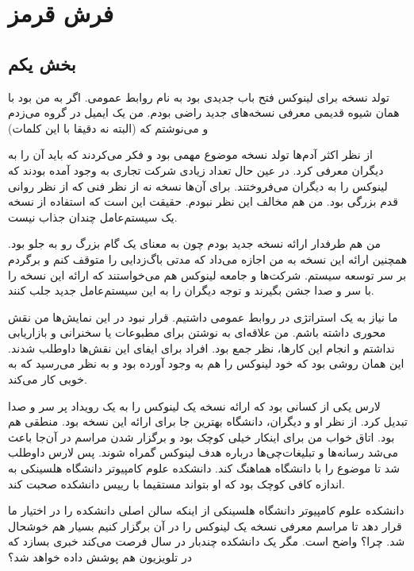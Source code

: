 \chapter{فرش قرمز}\label{ch4}
\section{بخش یکم}
تولد نسخه  برای لینوکس فتح باب جدیدی بود به نام روابط
عمومی. اگر به من بود با همان شیوه قدیمی معرفی نسخه‌های جدید راضی
بودم. من یک ایمیل در گروه می‌زدم و می‌نوشتم که  (البته نه دقیقا با این کلمات)

از نظر اکثر آدم‌ها تولد نسخه  موضوع مهمی بود و فکر می‌کردند که
باید آن را به دیگران معرفی کرد. در عین حال تعداد زیادی شرکت تجاری به
وجود آمده بودند که لینوکس را به دیگران می‌فروختند. برای آن‌ها نسخه
 نه از نظر فنی که از نظر روانی قدم بزرگی بود. من هم مخالف
این نظر نبودم. حقیقت این است که استفاده از نسخه  یک
سیستم‌عامل چندان جذاب نیست.

من هم طرفدار ارائه نسخه جدید بودم چون به معنای یک گام بزرگ رو به جلو
بود. همچنین ارائه این نسخه به من اجازه می‌داد که مدتی باگ‌زدایی را متوقف
کنم و برگردم بر سر توسعه سیستم. شرکت‌ها و جامعه لینوکس هم می‌خواستند که
ارائه این نسخه را با سر و صدا جشن بگیرند و توجه دیگران را به این
سیستم‌عامل جدید جلب کنند.

ما نیاز به یک استراتژی در روابط عمومی داشتیم. قرار نبود در این نمایش‌ها
من نقش محوری داشته باشم. من علاقه‌ای به نوشتن برای مطبوعات یا سخنرانی و
بازاریابی نداشتم و انجام این کارها، نظر جمع بود. افراد برای ایفای این
نقش‌ها داوطلب شدند. این همان روشی بود که خود لینوکس را هم به وجود آورده
بود و به نظر می‌رسید که به خوبی کار می‌کند.

لارس یکی از کسانی بود که ارائه نسخه یک لینوکس را به یک رویداد پر سر و
صدا تبدیل کرد. از نظر او و دیگران، دانشگاه بهترین جا برای ارائه این
نسخه بود. منطقی هم بود. اتاق خواب من برای اینکار خیلی کوچک بود و
برگزار شدن مراسم در آن‌جا باعث می‌شد رسانه‌ها و تبلیغات‌چی‌ها درباره هدف
لینوکس گمراه شوند. پس لارس داوطلب شد تا موضوع را با دانشگاه هماهنگ
کند. دانشکده علوم کامپیوتر دانشگاه هلسینکی به اندازه کافی کوچک بود که
او بتواند مستقیما با رییس دانشکده صحبت کند.

دانشکده علوم کامپیوتر دانشگاه هلسینکی از اینکه سالن اصلی دانشکده را در
اختیار ما قرار دهد تا مراسم معرفی نسخه یک لینوکس را در آن برگزار کنیم
بسیار هم خوشحال شد. چرا؟ واضح است. مگر یک دانشکده چندبار در سال فرصت
می‌کند خبری بسازد که در تلویزیون هم پوشش داده خواهد شد؟

